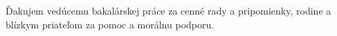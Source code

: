 {~}\vspace{12cm}

\noindent
\begin{minipage}{0.25\textwidth}~\end{minipage}
\begin{center}
\begin{minipage}{1\textwidth}

Ďakujem vedúcemu bakalárskej práce \mfadvisor za cenné rady 
a pripomienky, rodine a blízkym priateľom za pomoc a morálnu podporu.

\end{minipage}
\end{center}
\hfill\mfauthor
\vfill\eject 

